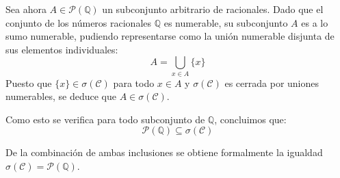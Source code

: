 \begin{problema}
\begin{enumerate}
    Sea ahora $A \in \mathcal{P}(\mathbb{Q})$ un subconjunto arbitrario de racionales. Dado que el conjunto de los números racionales $\mathbb{Q}$ es numerable, su subconjunto $A$ es a lo sumo numerable, pudiendo representarse como la unión numerable disjunta de sus elementos individuales:
    \[
        A = \bigcup_{x \in A} \{x\}
    \]
    Puesto que $\{x\} \in \sigma(\mathcal{C})$ para todo $x \in A$ y $\sigma(\mathcal{C})$ es cerrada por uniones numerables, se deduce que $A \in \sigma(\mathcal{C})$.
    
    Como esto se verifica para todo subconjunto de $\mathbb{Q}$, concluimos que:
    \[
        \mathcal{P}(\mathbb{Q}) \subseteq \sigma(\mathcal{C})
    \]
\end{enumerate}

De la combinación de ambas inclusiones se obtiene formalmente la igualdad $\sigma(\mathcal{C}) = \mathcal{P}(\mathbb{Q})$.
\end{problema}
\newpage
